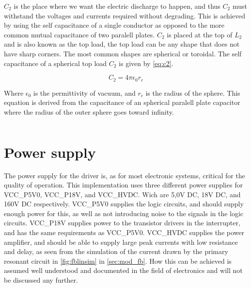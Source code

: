 $C_2$ is the place where we want the electric discharge to happen, and thus $C_2$ must withstand the voltages and currents required without degrading. This is achieved by using the self capacitance of a single conductor as opposed to the more common mutual capacitance of two paralell plates. $C_2$ is placed at the top of $L_2$ and is also known as the top load, the top load can be any shape that does not have sharp corners. The most common shapes are spherical or toroidal. The self capacitance of a spherical top load $C_2$ is given by \cref{eq:c2}.

\begin{equation} \label{eq:c2}
    C_2 = 4 \pi {\epsilon}_0 r_{c}
\end{equation}

Where ${\epsilon}_0$ is the permittivity of vacuum, and $r_c$ is the radius of the sphere. This equation is derived from the capacitance of an spherical paralell plate capacitor where the radius of the outer sphere goes toward infinity.

\begin{equation} \label{eq:}
    
\end{equation}


\section{Power supply}
The power supply for the driver is, as for most electronic systems, critical for the quality of operation. This implementation uses three different power supplies for VCC\_P5V0, VCC\_P18V, and VCC\_HVDC. Wich are 5,0V DC, 18V DC, and 160V DC respectively. VCC\_P5V0 supplies the logic circuits, and should supply enough power for this, as well as not introducing noise to the signals in the logic circuits. VCC\_P18V supplies power to the transistor drivers in the interrupter, and has the same requirements as VCC\_P5V0. VCC\_HVDC supplies the power amplifier, and should be able to supply large peak currents with low resistance and delay, as seen from the simulation of the current drawn by the primary resonant circuit in \cref{fig:fblinsim} in \cref{sec:mod_fb}. How this can be achieved is assumed well understood and documented in the field of electronics and will not be discussed any further.


